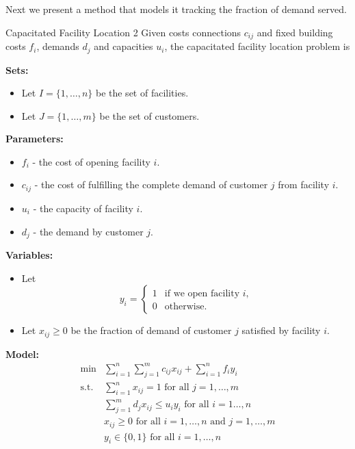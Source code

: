 Next we present a method that models it tracking the fraction of demand served.
\begin{general}{Capacitated Facility Location 2}{\npcomplete}
Given costs connections $c_{ij}$ and fixed building costs $f_i$, demands $d_j$ and capacities $u_i$, the capacitated facility location problem is 

\noindent \textbf{Sets:}
\begin{itemize}
\item Let $I = \{1,\dots, n\}$ be the set of facilities.
\item Let $J = \{1, \dots, m\}$ be the set of customers.
\end{itemize}

\noindent \textbf{Parameters:}
\begin{itemize}
\item $f_i$ - the cost of opening facility $i$.
\item $c_{ij}$ - the cost of fulfilling the complete demand of customer $j$ from facility $i$.
\item $u_{i}$ - the capacity of facility $i$.
\item $d_{j}$ - the demand by customer $j$.
\end{itemize}

\noindent \textbf{Variables:}
\begin{itemize}
\item Let 
\begin{equation*}
y_{i} = \begin{cases}
1 & \text{if we open facility $i$,}\\
0 & \text{otherwise.}
\end{cases}
\end{equation*}
\item Let $x_{ij} \geq 0$ be the fraction of demand of customer $j$ satisfied by facility $i$.
\end{itemize}

\noindent  \textbf{Model:}
\begin{align}
\min & \displaystyle\sum_{i=1}^n\sum_{j=1}^mc_{ij}x_{ij}+\sum_{i=1}^nf_iy_i \tag{total cost}\\
\text{s.t.} & \displaystyle\sum_{i=1}^nx_{ij}=1 \text{ for all }j=1,\dots,m \tag{assign demand to facility}\\
& \displaystyle \sum_{j=1}^md_jx_{ij}\leqslant u_iy_i\text{ for all }i=1\dots,n \tag{capacity of facility $i$}\\
&x_{ij}\geqslant0\text{ for all }i=1,\dots,n \text{ and }j=1,\dots,m \tag{nonnegative fraction of demand satisfied}\\
&y_i\in\{0,1\}\text{ for all } i=1,\dots,n \tag{open/not open facility}
\end{align}

\end{general}

